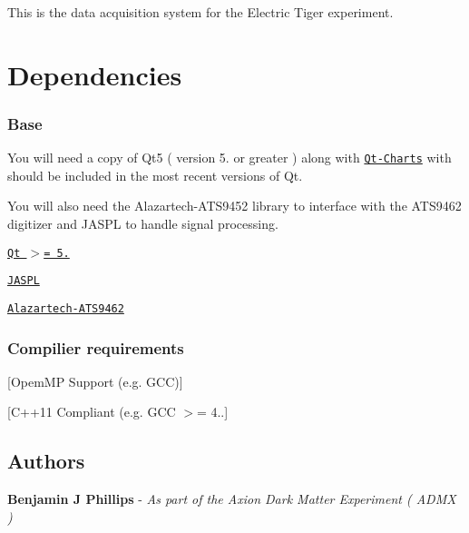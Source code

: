 This is the data acquisition system for the Electric Tiger experiment.

\section*{Dependencies}

\subsubsection*{Base}

You will need a copy of Qt5 ( version 5. or greater ) along with \href{https://doc.qt.io/qt-5/qtcharts-index.html}{\tt Qt-\/\+Charts} with should be included in the most recent versions of Qt.

You will also need the Alazartech-\/\+A\+T\+S9452 library to interface with the A\+T\+S9462 digitizer and J\+A\+S\+PL to handle signal processing.


\begin{DoxyItemize}
\item \href{http://doc.qt.io/qt-5/build-sources.html}{\tt Qt $>$= 5.}
\item \href{https://github.com/bejphil/JASPL}{\tt J\+A\+S\+PL}
\item \href{https://github.com/bejphil/Alazartech-ATS9462}{\tt Alazartech-\/\+A\+T\+S9462}
\end{DoxyItemize}

\subsubsection*{Compilier requirements}


\begin{DoxyItemize}
\item \mbox{[}Opem\+MP Support (e.\+g. G\+CC)\mbox{]}
\item \mbox{[}C++11 Compliant (e.\+g. G\+CC $>$= 4..\mbox{]}
\end{DoxyItemize}

\subsection*{Authors}


\begin{DoxyItemize}
\item {\bfseries Benjamin J Phillips} -\/ {\itshape As part of the Axion Dark Matter Experiment ( A\+D\+MX )} 
\end{DoxyItemize}